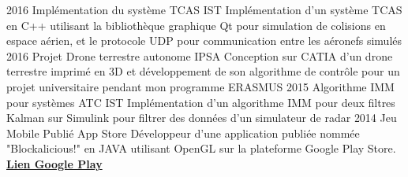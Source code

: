\documentclass[]{friggeri-cv} %
\begin{document}
\begin{entrylist}



\entry
{2016}
{Implémentation du système TCAS}
{IST}
{Implémentation d'un système TCAS en C++ utilisant la bibliothèque graphique Qt pour simulation de colisions en espace aérien, et le protocole UDP pour communication entre les aéronefs simulés}
\entry
{2016}
{Projet Drone terrestre autonome}
{IPSA}
{Conception sur CATIA d'un drone terrestre imprimé en 3D et développement de son algorithme de contrôle pour un projet universitaire pendant mon programme ERASMUS}
\entry
{2015}
{Algorithme IMM pour systèmes ATC}
{IST}
{Implémentation d'un algorithme IMM pour deux filtres Kalman sur Simulink pour filtrer des données d'un simulateur de radar}
\entry
{2014}
{Jeu Mobile Publié}
{App Store}
{Développeur d'une application publiée nommée "Blockalicious!" en JAVA utilisant OpenGL sur la plateforme Google Play Store.
\href{https://play.google.com/store/apps/details?id=com.guiero.blockaliciousfinal}{\textbf{Lien Google Play}}}
\end{entrylist}






\end{document}
